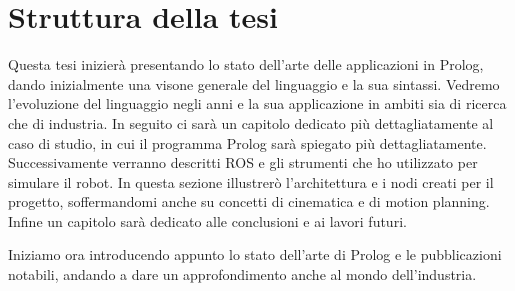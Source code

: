 \section{Struttura della tesi}
\label{sec:struttura}
Questa tesi inizierà presentando lo stato dell'arte delle applicazioni in Prolog, dando inizialmente una visone generale del linguaggio e la sua sintassi. Vedremo l'evoluzione del linguaggio negli anni e la sua applicazione in ambiti sia di ricerca che di industria.
In seguito ci sarà un capitolo dedicato più dettagliatamente al caso di studio, in cui il programma Prolog sarà spiegato più dettagliatamente. 
Successivamente verranno descritti ROS e gli strumenti che ho utilizzato per simulare il robot. In questa sezione illustrerò l'architettura e i nodi creati per il progetto, soffermandomi anche su concetti di cinematica e di motion planning.
Infine un capitolo sarà dedicato alle conclusioni e ai lavori futuri.

Iniziamo ora introducendo appunto lo stato dell'arte di Prolog e le pubblicazioni notabili, andando a dare un approfondimento anche al mondo dell'industria.

